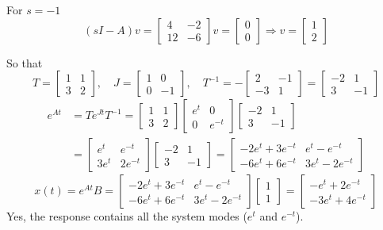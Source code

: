 \documentclass[12pt,a4paper]{article}
\begin{document}
	For $s =-1$
	\[
	(sI - A)v = \begin{bmatrix}
		4 & -2 \\ 12 & -6
	\end{bmatrix} v = \begin{bmatrix}
	 0 \\ 0
	\end{bmatrix} \Rightarrow v = \begin{bmatrix}
	1 \\ 2
	\end{bmatrix}
	\]
	
	So that 
	\[
	T = \begin{bmatrix}
		1 & 1\\ 3 & 2
	\end{bmatrix}, \quad J = \begin{bmatrix}
	1 & 0 \\ 0 & -1
	\end{bmatrix}, \quad T^{-1} = - \begin{bmatrix}
	2 & -1 \\ -3 & 1
	\end{bmatrix} = \begin{bmatrix}
	-2 & 1 \\ 3 & -1
	\end{bmatrix}
	\]
	\begin{align*}
		e^{At} &=T e^{Jt}T^{-1} =  \begin{bmatrix}
	1 & 1 \\ 3 & 2			
		\end{bmatrix} \begin{bmatrix}
		e^{t} & 0 \\ 0 & e^{-t}
		\end{bmatrix}\begin{bmatrix}
		-2 & 1 \\ 3 & -1
		\end{bmatrix} \\
		&=\begin{bmatrix}
			e^t & e^{-t} \\ 3e^t & 2e^{-t} 
		\end{bmatrix}\begin{bmatrix}
		-2 & 1 \\ 3 & -1
		\end{bmatrix} = \begin{bmatrix}
		-2e^t + 3e^{-t} & e^t - e^{-t} \\
		-6e^t + 6e^{-t} & 3e^{t} -2e^{-t}
		\end{bmatrix}
	\end{align*}
	\[
	x(t) = e^{At} B = \begin{bmatrix}
		-2e^t + 3e^{-t} & e^t - e^{-t} \\
		-6e^t + 6e^{-t} & 3e^{t} -2e^{-t}
	\end{bmatrix}\begin{bmatrix}
	1\\1
	\end{bmatrix} = \begin{bmatrix}
		-e^t + 2e^{-t} \\
		-3e^t + 4e^{-t}
 	\end{bmatrix}
	\]	
	Yes, the response contains all the system modes ($e^t$ and $e^{-t}$).
	
\end{document}
